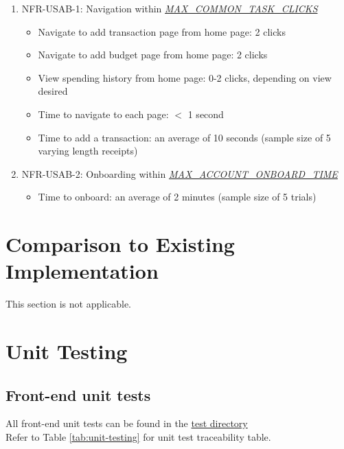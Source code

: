 \documentclass[12pt, titlepage]{article}
\begin{document}
\begin{enumerate}
\item NFR-USAB-1: Navigation within
\href{https://github.com/PlutosCapstone/Plutos/blob/main/docs/SRS/SRS.pdf}{\textit{MAX\_COMMON\_TASK\_CLICKS}}
  \begin{itemize}
    \item Navigate to add transaction page from home page: 2 clicks
    \item Navigate to add budget page from home page: 2 clicks
    \item View spending history from home page: 0-2 clicks, depending on view desired
    \item Time to navigate to each page: $<$ 1 second
    \item Time to add a transaction: an average of 10 seconds (sample size of 5
    varying length receipts)
  \end{itemize}
\item NFR-USAB-2: Onboarding within 
\href{https://github.com/PlutosCapstone/Plutos/blob/main/docs/SRS/SRS.pdf}{\textit{MAX\_ACCOUNT\_ONBOARD\_TIME}}
  \begin{itemize}
    \item Time to onboard: an average of 2 minutes (sample size of 5 trials)
  \end{itemize}

\end{enumerate}
\section{Comparison to Existing Implementation}	

This section is not applicable.

\section{Unit Testing}

\subsection{Front-end unit tests}

All front-end unit tests can be found in the \href{https://github.com/PlutosCapstone/Plutos/tree/main/src/client/tests}{test directory}\\
Refer to Table \ref{tab:unit-testing} for unit test traceability table.
\end{document}
